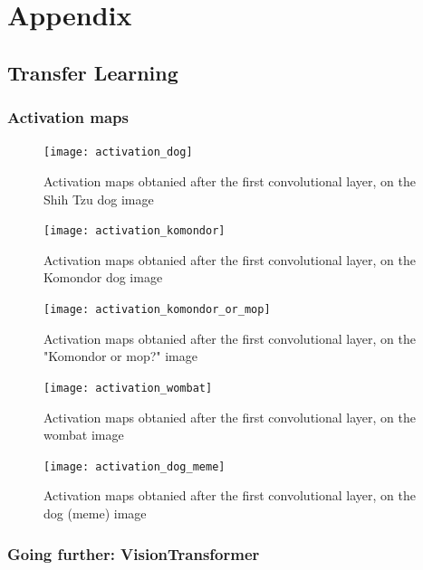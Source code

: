 \chapter{Appendix}
\section{Transfer Learning}
\graphicspath{{figs/2a/}}
\subsection{Activation maps} \label{appendix:activation_maps}

\begin{figure}[H]
    \centering
    \texttt{[image: activation\_dog]}
    \caption{Activation maps obtanied after the first convolutional layer, on the Shih Tzu dog image}
    \label{fig:activation_dog}
\end{figure} 

\begin{figure}[H]
    \centering
    \texttt{[image: activation\_komondor]}
    \caption{Activation maps obtanied after the first convolutional layer, on the Komondor dog image}
    \label{fig:activation_komondor}
\end{figure} 

\begin{figure}[H]
    \centering
    \texttt{[image: activation\_komondor\_or\_mop]}
    \caption{Activation maps obtanied after the first convolutional layer, on the "Komondor or mop?" image}
    \label{fig:activation_komondor_or_mop}
\end{figure} 

\begin{figure}[H]
    \centering
    \texttt{[image: activation\_wombat]}
    \caption{Activation maps obtanied after the first convolutional layer, on the wombat image}
    \label{fig:activation_wombat}
\end{figure} 

\begin{figure}[H]
    \centering
    \texttt{[image: activation\_dog\_meme]}
    \caption{Activation maps obtanied after the first convolutional layer, on the dog (meme) image}
    \label{fig:activation_dog_meme}
\end{figure} 

\subsection{Going further: VisionTransformer} \label{appendix:vit}

